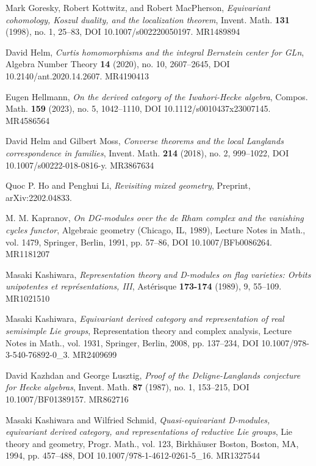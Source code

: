 \begin{refs}

\item[{[GKM98]}] Mark Goresky, Robert Kottwitz, and Robert MacPherson, \emph{Equivariant cohomology, Koszul duality, and the localization theorem}, Invent. Math. \textbf{131} (1998), no. 1, 25--83, DOI 10.1007/s002220050197. MR1489894
\item[{[H20]}] David Helm, \emph{Curtis homomorphisms and the integral Bernstein center for GLn}, Algebra Number Theory \textbf{14} (2020), no. 10, 2607--2645, DOI 10.2140/ant.2020.14.2607. MR4190413
\item[{[He20]}] Eugen Hellmann, \emph{On the derived category of the Iwahori-Hecke algebra}, Compos. Math. \textbf{159} (2023), no. 5, 1042--1110, DOI 10.1112/s0010437x23007145. MR4586564
\item[{[HM18]}] David Helm and Gilbert Moss, \emph{Converse theorems and the local Langlands correspondence in families}, Invent. Math. \textbf{214} (2018), no. 2, 999--1022, DOI 10.1007/s00222-018-0816-y. MR3867634
\item[{[HL22]}] Quoc P. Ho and Penghui Li, \emph{Revisiting mixed geometry}, Preprint, arXiv:2202.04833.
\item[{[Ka91]}] M. M. Kapranov, \emph{On DG-modules over the de Rham complex and the vanishing cycles functor}, Algebraic geometry (Chicago, IL, 1989), Lecture Notes in Math., vol. 1479, Springer, Berlin, 1991, pp. 57--86, DOI 10.1007/BFb0086264. MR1181207
\item[{[K89]}] Masaki Kashiwara, \emph{Representation theory and D-modules on flag varieties: Orbits unipotentes et repr\'esentations, III}, Ast\'erisque \textbf{173-174} (1989), 9, 55--109. MR1021510
\item[{[K08]}] Masaki Kashiwara, \emph{Equivariant derived category and representation of real semisimple Lie groups}, Representation theory and complex analysis, Lecture Notes in Math., vol. 1931, Springer, Berlin, 2008, pp. 137--234, DOI 10.1007/978-3-540-76892-0\_3. MR2409699
\item[{[KL87]}] David Kazhdan and George Lusztig, \emph{Proof of the Deligne-Langlands conjecture for Hecke algebras}, Invent. Math. \textbf{87} (1987), no. 1, 153--215, DOI 10.1007/BF01389157. MR862716
\item[{[KS94]}] Masaki Kashiwara and Wilfried Schmid, \emph{Quasi-equivariant D-modules, equivariant derived category, and representations of reductive Lie groups}, Lie theory and geometry, Progr. Math., vol. 123, Birkh\"auser Boston, Boston, MA, 1994, pp. 457--488, DOI 10.1007/978-1-4612-0261-5\_16. MR1327544

\end{refs}
